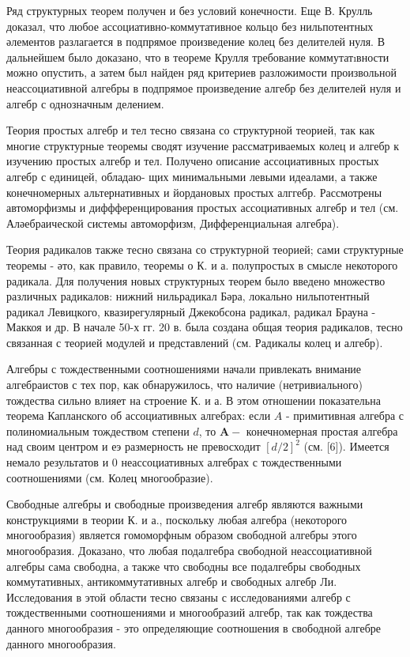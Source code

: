 \documentclass[10pt]{article}
\begin{document}
Ряд структурных теорем получен и без условий конечности. Еще В. Крулль доказал, что любое ассоциативно-коммутативное кольцо без нильпотентных әлементов разлагается в подпрямое произведение колец без делителей нуля. В дальнейшем было доказано, что в теореме Крулля требование коммутатıвности можно опустить, а затем был найден ряд критериев разложимости произвольной неассоциативной алгебры в подпрямое произведение алгебр без делителей нуля и алгебр с однозначным делением.



Теория простых алгебр и тел тесно связана со структурной теорией, так как многие структурные теоремы сводят изучение рассматриваемых колец и алгебр к изучению простых алгебр и тел. Получено описание ассоциативных простых алгебр с единицей, обладаю- щих минимальными левыми идеалами, а также конечномерных альтернативных и йордановых простых алггебр. Рассмотрены автоморфизмы и диффференцирования простых ассоциативных алгебр и тел (см. Аләебраической системы автоморфизм, Дифференциальная алгебра).



Теория радикалов также тесно связана со структурной теорией; сами структурные теоремы - әто, как правило, теоремы о К. и а. полупростых в смысле некоторого радикала. Для получения новых структурных теорем было введено множество различных радикалов: нижний нильрадикал Бәра, локально нильпотентный радикал Левицкого, квазирегулярный Джекобсона радикал, радикал Брауна - Маккоя и др. В начале 50-х гг. 20 в. была создана общая теория радикалов, тесно связанная с теорией модулей и представлений (см. Радикалы колец и алгебр).



Алгебры с тождественными соотношениями начали привлекать внимание алгебраистов с тех пор, как обнаружилось, что наличие (нетривиального) тождества сильно влияет на строение К. и а. В этом отношении показательна теорема Капланского об ассоциативных алгебрах: если $A$ - примитивная алгебра с полиномиальным тождеством степени $d$, то $\boldsymbol{A}-$ конечномерная простая алгебра над своим центром и еэ размерность не превосходит $[d / 2]^{2}$ (см. [6]). Имеется немало результатов и 0 неассоциативных алгебрах с тождественными соотношениями (см. Колец многообразие).



Свободные алгебры и свободные произведения алгебр являются важными конструкциями в теории К. и а., поскольку любая алгебра (некоторого многообразия) является гомоморфным образом свободной алгебры этого многообразия. Доказано, что любая подалгебра свободной неассоциативной алгебры сама свободна, а также что свободны все подалгебры свободных коммутативных, антикоммутативных алгебр и свободных алгебр Ли. Исследования в этой области тесно связаны с исследованиями алгебр с тождественными соотношениями и многообразий алгебр, так как тождества данного многообразия - это определяющие соотношения в свободной алгебре данного многообразия.
\end{document}

